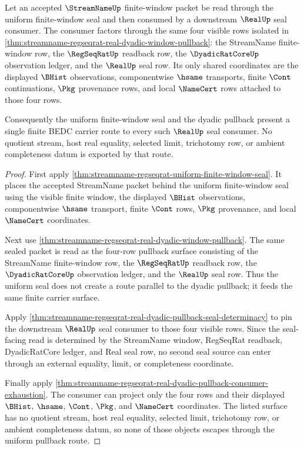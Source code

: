 \begin{theorem}
\label{thm:streamname-uniform-pullback-nonescape}
Let an accepted $\StreamNameUp$ finite-window packet be read through the
uniform finite-window seal and then consumed by a downstream $\RealUp$ seal
consumer. The consumer factors through the same four visible rows isolated in
\autoref{thm:streamname-regseqrat-real-dyadic-window-pullback}: the
StreamName finite-window row, the $\RegSeqRatUp$ readback row, the
$\DyadicRatCoreUp$ observation ledger, and the $\RealUp$ seal row. Its only
shared coordinates are the displayed $\BHist$ observations, componentwise
$\hsame$ transports, finite $\Cont$ continuations, $\Pkg$ provenance rows,
and local $\NameCert$ rows attached to those four rows.

Consequently the uniform finite-window seal and the dyadic pullback present a
single finite BEDC carrier route to every such $\RealUp$ seal consumer. No
quotient stream, host real equality, selected limit, trichotomy row, or
ambient completeness datum is exported by that route.
\end{theorem}
\begin{proof}
First apply \autoref{thm:streamname-regseqrat-uniform-finite-window-seal}. It
places the accepted StreamName packet behind the uniform finite-window seal
using the visible finite window, the displayed $\BHist$ observations,
componentwise $\hsame$ transport, finite $\Cont$ rows, $\Pkg$ provenance, and
local $\NameCert$ coordinates.

Next use \autoref{thm:streamname-regseqrat-real-dyadic-window-pullback}. The
same sealed packet is read as the four-row pullback surface consisting of the
StreamName finite-window row, the $\RegSeqRatUp$ readback row, the
$\DyadicRatCoreUp$ observation ledger, and the $\RealUp$ seal row. Thus the
uniform seal does not create a route parallel to the dyadic pullback; it feeds
the same finite carrier surface.

Apply
\autoref{thm:streamname-regseqrat-real-dyadic-pullback-seal-determinacy} to
pin the downstream $\RealUp$ seal consumer to those four visible rows. Since
the seal-facing read is determined by the StreamName window, RegSeqRat
readback, DyadicRatCore ledger, and Real seal row, no second seal source can
enter through an external equality, limit, or completeness coordinate.

Finally apply
\autoref{thm:streamname-regseqrat-real-dyadic-pullback-consumer-exhaustion}.
The consumer can project only the four rows and their displayed $\BHist$,
$\hsame$, $\Cont$, $\Pkg$, and $\NameCert$ coordinates. The listed surface
has no quotient stream, host real equality, selected limit, trichotomy row,
or ambient completeness datum, so none of those objects escapes through the
uniform pullback route.
\end{proof}

